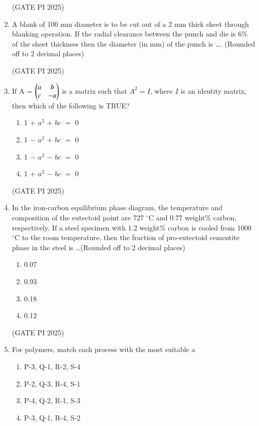 \documentclass[journal,12pt,onecolumn]{IEEEtran}
\theoremstyle{remark}
\begin{document}
\begin{enumerate}
\hfill (GATE PI 2025)

\item A blank of 100 mm diameter is to be cut out of a 2 mm thick sheet through blanking operation. If the radial clearance between the punch and die is 6\% of the sheet thickness then the diameter (in mm) of the punch is \dots . (Rounded off to 2 decimal places)

\hfill (GATE PI 2025)

\item If A =
$
\begin{pmatrix}
a & b \\
c & -a 
\end{pmatrix} 
$
is a matrix such that $A^2=I$, where $I$ is an identity matrix, then which of the following is TRUE?

\begin{enumerate}
    \item 1 $+$ $a^2$ $+$ $bc$ $=$ 0
    \item 1 $-$ $a^2$ $+$ $bc$ $=$ 0
    \item 1 $-$ $a^2$ $-$ $bc$ $=$ 0
    \item 1 $+$ $a^2$ $-$ $bc$ $=$ 0
\end{enumerate}

\hfill (GATE PI 2025)

\item In the iron-carbon equilibrium phase diagram, the temperature and composition of the eutectoid point are 727 $^\circ$C and 0.77 weight\% carbon, respectively. If a steel specimen with 1.2 weight\% carbon is cooled from 1000 $^\circ$C to the room temperature, then the fraction of pro-eutectoid cementite phase in the steel is \dots (Rounded off to 2 decimal places)

\begin{multicols}{4}
\begin{enumerate}
    \item 0.07
    \item 0.93
    \item 0.18
    \item 0.12
\end{enumerate}
\end{multicols}

\hfill (GATE PI 2025)

\item For polymers, match each process with the most suitable a



\begin{enumerate}
\item P-3, Q-1, R-2, S-4
\item P-2, Q-3, R-4, S-1
\item P-4, Q-2, R-1, S-3
\item P-3, Q-1, R-4, S-2
\end{enumerate}


\end{enumerate}
\end{document}
